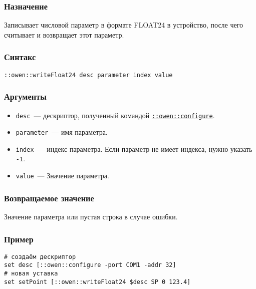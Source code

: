 \documentclass[12pt, a4paper]{article}
\newcommand{\CMD}[1]{{\tt \hyperref[#1]{#1}}}
\newcommand{\EXAMPLE}{\subsubsection*{Пример}}
\newcommand{\PURPOSE}{\subsubsection*{Назначение}}
\newcommand{\SYNTAX}[1]{\subsubsection*{Синтакс}{\tt #1}}
\newcommand{\ARGUMENTS}{\subsubsection*{Аргументы}}
\newcommand{\RETURN}{\subsubsection*{Возвращаемое значение}}
\newcommand{\BEGINARGUMENTS}{\ARGUMENTS\begin{itemize}}
\newcommand{\ENDARGUMENTS}{\end{itemize}}
\newcommand{\ARGUMENT}[1]{\item {\tt \mbox{#1}}~---}
\newcommand{\DESCARGUMENT}{\ARGUMENT{desc} дескриптор, полученный командой \CMD{::owen::configure}.}
\begin{document}
\PURPOSE

Записывает числовой параметр в формате FLOAT24 в устройство, после чего считывает и возвращает этот параметр.

\SYNTAX{::owen::writeFloat24 desc parameter index value}

\BEGINARGUMENTS
\DESCARGUMENT
\ARGUMENT{parameter} имя параметра.
\ARGUMENT{index} индекс параметра. Если параметр не имеет индекса, нужно указать {\tt -1}.
\ARGUMENT{value} Значение параметра.
\ENDARGUMENTS

\RETURN

Значение параметра или пустая строка в случае ошибки.

\EXAMPLE

\begin{verbatim} 
# создаём дескриптор
set desc [::owen::configure -port COM1 -addr 32]
# новая уставка
set setPoint [::owen::writeFloat24 $desc SP 0 123.4]
\end{verbatim} 
\end{document}

